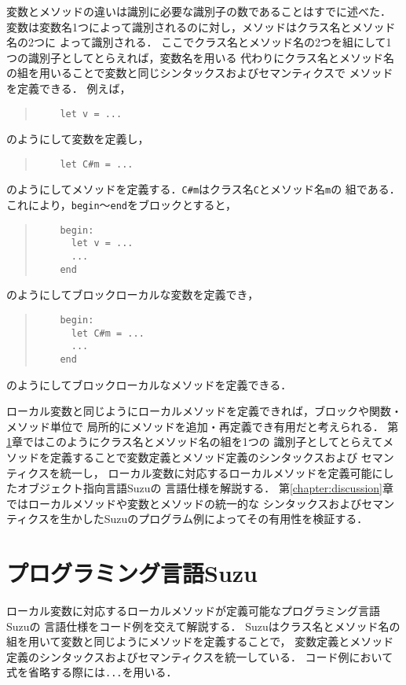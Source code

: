 \documentclass[a4paper,11pt,dvipdfmx]{jreport}
\begin{document}
変数とメソッドの違いは識別に必要な識別子の数であることはすでに述べた．
変数は変数名1つによって識別されるのに対し，メソッドはクラス名とメソッド名の2つに
よって識別される．
ここでクラス名とメソッド名の2つを組にして1つの識別子としてとらえれば，変数名を用いる
代わりにクラス名とメソッド名の組を用いることで変数と同じシンタックスおよびセマンティクスで
メソッドを定義できる．
例えば，
\begin{quote}
	\begin{verbatim}
	let v = ...
	\end{verbatim}
\end{quote}
のようにして変数を定義し，
\begin{quote}
	\begin{verbatim}
	let C#m = ...
	\end{verbatim}
\end{quote}
のようにしてメソッドを定義する．\verb|C#m|はクラス名\verb|C|とメソッド名\verb|m|の
組である．
これにより，\verb|begin|～\verb|end|をブロックとすると，
\begin{quote}
	\begin{verbatim}
	begin:
	  let v = ...
	  ...
	end
	\end{verbatim}
\end{quote}
のようにしてブロックローカルな変数を定義でき，
\begin{quote}
	\begin{verbatim}
	begin:
	  let C#m = ...
	  ...
	end
	\end{verbatim}
\end{quote}
のようにしてブロックローカルなメソッドを定義できる．

ローカル変数と同じようにローカルメソッドを定義できれば，ブロックや関数・メソッド単位で
局所的にメソッドを追加・再定義でき有用だと考えられる．
第\ref{chapter:implementation}章ではこのようにクラス名とメソッド名の組を1つの
識別子としてとらえてメソッドを定義することで変数定義とメソッド定義のシンタックスおよび
セマンティクスを統一し，
ローカル変数に対応するローカルメソッドを定義可能にしたオブジェクト指向言語Suzuの
言語仕様を解説する．
第\ref{chapter:discussion}章ではローカルメソッドや変数とメソッドの統一的な
シンタックスおよびセマンティクスを生かしたSuzuのプログラム例によってその有用性を検証する．


\chapter{プログラミング言語Suzu}
\label{chapter:implementation}

ローカル変数に対応するローカルメソッドが定義可能なプログラミング言語Suzuの
言語仕様をコード例を交えて解説する．
Suzuはクラス名とメソッド名の組を用いて変数と同じようにメソッドを定義することで，
変数定義とメソッド定義のシンタックスおよびセマンティクスを統一している．
コード例において式を省略する際には\verb|...|を用いる．
\end{document}
